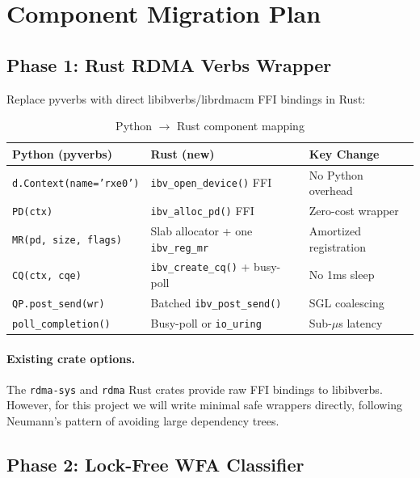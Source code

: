 \documentclass[11pt,letterpaper]{article}
\begin{document}
\section{Component Migration Plan}

\subsection{Phase 1: Rust RDMA Verbs Wrapper}

Replace pyverbs with direct libibverbs/librdmacm FFI bindings in Rust:

\begin{table}[htbp]
\centering
\caption{Python $\to$ Rust component mapping}
\label{tab:migration-mapping}
\begin{tabular}{@{}lll@{}}
\toprule
\textbf{Python (pyverbs)} & \textbf{Rust (new)} & \textbf{Key Change} \\
\midrule
\texttt{d.Context(name='rxe0')} & \texttt{ibv\_open\_device()} FFI & No Python overhead \\
\texttt{PD(ctx)} & \texttt{ibv\_alloc\_pd()} FFI & Zero-cost wrapper \\
\texttt{MR(pd, size, flags)} & Slab allocator + one \texttt{ibv\_reg\_mr} & Amortized registration \\
\texttt{CQ(ctx, cqe)} & \texttt{ibv\_create\_cq()} + busy-poll & No 1ms sleep \\
\texttt{QP.post\_send(wr)} & Batched \texttt{ibv\_post\_send()} & SGL coalescing \\
\texttt{poll\_completion()} & Busy-poll or \texttt{io\_uring} & Sub-$\mu$s latency \\
\bottomrule
\end{tabular}
\end{table}

\paragraph{Existing crate options.}
The \texttt{rdma-sys} and \texttt{rdma} Rust crates provide raw FFI bindings to libibverbs. However, for this project we will write minimal safe wrappers directly, following Neumann's pattern of avoiding large dependency trees.

\subsection{Phase 2: Lock-Free WFA Classifier}
\end{document}

